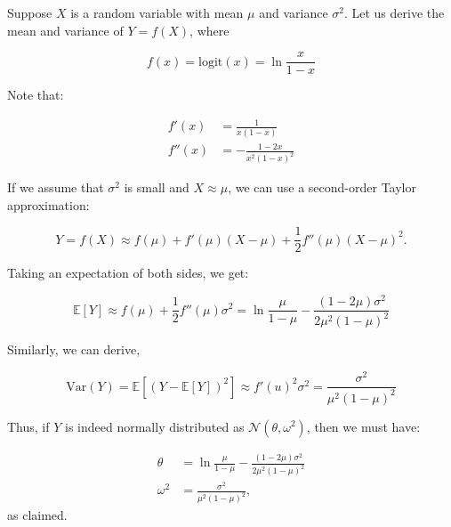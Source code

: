 \documentclass[tikz]{article}
\newcommand{\logit}{\mathrm{logit}}
\begin{document}
Suppose $X$ is a random variable with mean $\mu$ and variance $\sigma^2$. Let us derive the mean and variance of $Y = f(X)$, where

$$f(x) = \logit(x) = \ln{\frac{x}{1-x}}$$

Note that:

\begin{align*}
f'(x) &= \frac{1}{x(1-x)} \\
f''(x) &= -\frac{1-2x}{x^2(1-x)^2}
\end{align*}

If we assume that $\sigma^2$ is small and $X \approx \mu$, we can use a second-order Taylor approximation:

$$Y = f(X) \approx f(\mu) + f'(\mu)(X-\mu) + \frac{1}{2}f''(\mu)(X-\mu)^2.$$

Taking an expectation of both sides, we get:

$$
\mathbb{E}[Y] \approx f(\mu) + \frac{1}{2} f''(\mu)\sigma^2 = \ln{\frac{\mu}{1-\mu}} - \frac{(1-2\mu)\sigma^2}{2\mu^2(1-\mu)^2}
$$

Similarly, we can derive,

$$
\mathrm{Var}(Y) = \mathbb{E}[(Y - \mathbb{E}[Y])^2] \approx f'(u)^2\sigma^2 = \frac{\sigma^2}{\mu^2(1-\mu)^2}
$$

Thus, if $Y$ is indeed normally distributed as $\mathcal{N}(\theta, \omega^2)$, then we must have:

\begin{align*}
\theta &= \ln{\frac{\mu}{1-\mu}} - \frac{(1-2\mu)\sigma^2}{2\mu^2(1-\mu)^2} \\
\omega^2 &= \frac{\sigma^2}{\mu^2(1-\mu)^2},
\end{align*}
as claimed.
\end{document}
